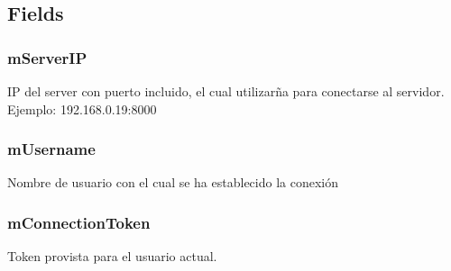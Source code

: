 \documentclass[letterpaper,10pt,english]{sphinxmanual}
\begin{document}
\subsection{Fields}
\label{Singletons/ServerHandler:fields}

\subsubsection{mServerIP}
\label{Singletons/ServerHandler:mserverip}

\begin{fulllineitems}
\label{Singletons/ServerHandler:com.fiuba.tallerii.jobify.ServerHandler.mServerIP}
IP del server con puerto incluido, el cual utilizarña para conectarse al servidor. Ejemplo: 192.168.0.19:8000

\end{fulllineitems}



\subsubsection{mUsername}
\label{Singletons/ServerHandler:musername}

\begin{fulllineitems}
\label{Singletons/ServerHandler:com.fiuba.tallerii.jobify.ServerHandler.mUsername}
Nombre de usuario con el cual se ha establecido la conexión

\end{fulllineitems}



\subsubsection{mConnectionToken}
\label{Singletons/ServerHandler:mconnectiontoken}

\begin{fulllineitems}
\label{Singletons/ServerHandler:com.fiuba.tallerii.jobify.ServerHandler.mConnectionToken}
Token provista para el usuario actual.

\end{fulllineitems}
\end{document}
